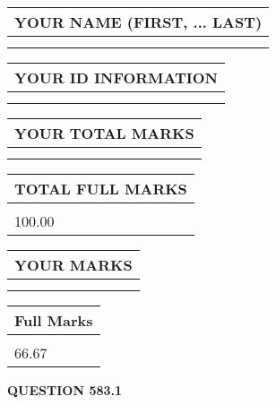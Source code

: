 \documentclass{ctexart}
\begin{document}
   
   
   
\newpage 
\setcounter{page}{ 
   583001 } 
   
   
   
   
\noindent\begin{tabular}{|l|}
\hline
YOUR NAME (FIRST, ... LAST)  \\
\hline
 \\ 
 \\ 
\hline
\end{tabular}
\hspace{0.05in} \begin{tabular}{|l|}
\hline
 YOUR   ID   INFORMATION  \\
\hline
 \\ 
 \\ 
\hline
\end{tabular}
   
   
\vspace{0.2in}\noindent\begin{tabular}{|l|}
\hline
YOUR TOTAL MARKS  \\
\hline
 \\ 
 \\ 
\hline
\end{tabular}
\hspace{0.05in} \begin{tabular}{|l|}
\hline
TOTAL FULL MARKS  \\
\hline
 \\ 
100.00 \\
\hline
\end{tabular}
   
   
 \vspace{0.2in}
 
 
 
 
   
   
  
\vspace{0.2in}
  
\noindent\begin{tabular}{|l|}
\hline
 YOUR MARKS  \\
\hline
 \\ 
 \\ 
\hline
\end{tabular}
\hspace{0.05in} \begin{tabular}{|l|}
\hline
 Full Marks  \\
\hline
 \\ 
66.67 \\
\hline
\end{tabular}
{\textbf{\Large{QUESTION
583.1 
}}}
  
\end{document}
